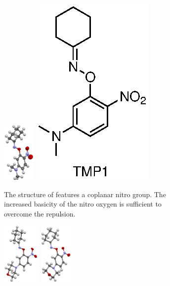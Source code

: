 \begin{refsection}
\begin{figure}
    \centering
    \begin{subfigure}[b]{0.47\linewidth}
        \centering
        \includegraphics[height=3cm]{Figures/cyclohexanone-oxime-2n-5nme2p.pdf}
        \includegraphics[scale=0.74]{Figures/cyclohexanone-oxime-2n-5nme2p.eps}
        \caption[Structure of .]{The structure of  features a coplanar nitro group. The increased basicity of the nitro oxygen is sufficient to overcome the repulsion.}\label{fig:cyclohexanone-oxime-2n-5nme2p}
    \end{subfigure}
    \hfill
    \begin{subfigure}[b]{0.47\linewidth}
        \centering
        \includegraphics[height=3cm]{Figures/cyclohexanone-oxime-2n-5mpa.pdf}
        \includegraphics[height=3cm]{Figures/cyclohexanone-oxime-2n-5mpb.pdf}

\end{subfigure}
\end{figure}
\end{refsection}
